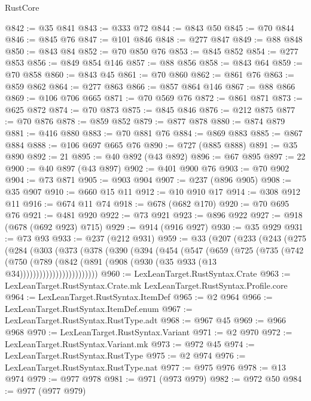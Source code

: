 \begin{lexlean}{RustCore}
\begin{coremodule}
@842 := @35 @841
@843 := @333 @72
@844 := @843 @50
@845 := @70 @844
@846 := @845 @76
@847 := @101 @846
@848 := @277 @847
@849 := @88 @848
@850 := @843 @84
@852 := @70 @850 @76
@853 := @845 @852
@854 := @277 @853
@856 := @849 @854 @146
@857 := @88 @856
@858 := @843 @64
@859 := @70 @858
@860 := @843 @45
@861 := @70 @860
@862 := @861 @76
@863 := @859 @862
@864 := @277 @863
@866 := @857 @864 @146
@867 := @88 @866
@869 := @106 @706 @665
@871 := @70 @569 @76
@872 := @861 @871
@873 := @625 @872
@874 := @70 @873
@875 := @845 @846
@876 := @212 @875
@877 := @70 @876
@878 := @859 @852
@879 := @877 @878
@880 := @874 @879
@881 := @416 @880
@883 := @70 @881 @76
@884 := @869 @883
@885 := @867 @884
@888 := @106 @697 @665 @76
@890 := @727 (@885 @888)
@891 := @35 @890
@892 := 21
@895 := @40 @892 (@43 @892)
@896 := @67 @895
@897 := 22
@900 := @40 @897 (@43 @897)
@902 := @401 @900 @76
@903 := @70 @902
@904 := @73 @871
@905 := @903 @904
@907 := @237 (@896 @905)
@908 := @35 @907
@910 := @660 @15 @11
@912 := @10 @910 @17
@914 := @308 @912 @11
@916 := @674 @11 @74
@918 := @678 (@682 @170)
@920 := @70 @695 @76
@921 := @481 @920
@922 := @73 @921
@923 := @896 @922
@927 := @918 (@678 (@692 @923) @715)
@929 := @914 (@916 @927)
@930 := @35 @929
@931 := @73 @93
@933 := @237 (@212 @931)
@959 := @33
    (@207
      (@233
        (@243
          (@275
            (@284
              (@303
                (@373
                  (@378
                    (@390
                      (@394
                        (@454
                          (@547
                            (@659
                              (@725
                                (@735
                                  (@742
                                    (@750
                                      (@789
                                        (@842
                                          (@891
                                            (@908 (@930 (@35 @933 (@13 @34))))))))))))))))))))))))
@960 := LexLeanTarget.RustSyntax.Crate
@963 := LexLeanTarget.RustSyntax.Crate.mk LexLeanTarget.RustSyntax.Profile.core
@964 := LexLeanTarget.RustSyntax.ItemDef
@965 := @2 @964
@966 := LexLeanTarget.RustSyntax.ItemDef.enum
@967 := LexLeanTarget.RustSyntax.RustType.adt
@968 := @967 @45
@969 := @966 @968
@970 := LexLeanTarget.RustSyntax.Variant
@971 := @2 @970
@972 := LexLeanTarget.RustSyntax.Variant.mk
@973 := @972 @45
@974 := LexLeanTarget.RustSyntax.RustType
@975 := @2 @974
@976 := LexLeanTarget.RustSyntax.RustType.nat
@977 := @975 @976
@978 := @13 @974
@979 := @977 @978
@981 := @971 (@973 @979)
@982 := @972 @50
@984 := @977 (@977 @979)

\end{coremodule}
\end{lexlean}
